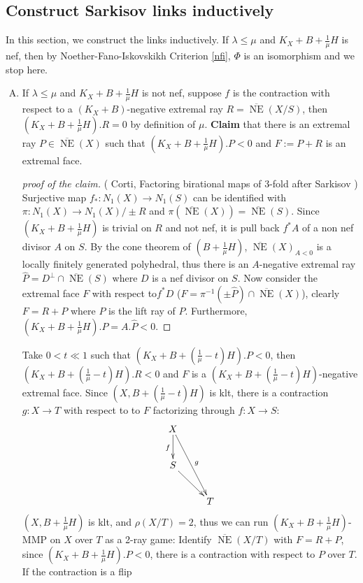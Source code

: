 \documentclass{article}
\begin{document}
\subsection{Construct Sarkisov links inductively}\label{constructlink1}
In this section, we construct the links inductively. If $ \lambda\leqslant\mu $ and $ K_X+B+\frac{1}{\mu}H $ is nef, then by Noether-Fano-Iskovskikh Criterion \ref{nfi}, $ \Phi $ is an isomorphism and we stop here.
\begin{enumerate}[(A)]
  \item\label{1A} If $ \lambda\leqslant\mu $ and $ K_X+B+\frac{1}{\mu}H $ is not nef, suppose $ f $ is the contraction with respect to a $ (K_X+B) $-negative extremal ray $ R= \overline{\operatorname{ NE }}(X/S) $, then $ (K_X+B+\frac{1}{\mu}H).R=0 $ by definition of $ \mu $. \textbf{Claim} that there is an extremal ray $ P\in \overline{\operatorname{ NE }}(X) $ such that $ (K_X+B+\frac{1}{\mu}H).P<0 $ and $ F:=P+R $ is an extremal face.
    \begin{proof}[proof of the claim]
    ( Corti, Factoring birational maps of 3-fold after Sarkisov ) Surjective map $ f_*:N_1(X)\to N_1(S) $ can be identified with $ \pi: N_1(X)\to N_1(X)/\pm R $ and $ \pi(\overline{\operatorname{NE}}(X))=\overline{\operatorname{NE}}(S) $. Since $ (K_X+B+\frac{1}{\mu}H) $ is trivial on $ R $ and not nef, it is pull back $ f^*A $ of a non nef divisor $ A $ on $ S $. By the cone theorem of $ (B+\frac{1}{\mu}H) $, $ \overline{\operatorname{NE}}(X)_{A<0} $ is a locally finitely generated polyhedral, thus there is an  $ A $-negative extremal ray $ \hat{P}=D^\perp\cap \overline{\operatorname{NE}}(S) $ where $ D $ is a nef divisor on $ S $. Now consider the extremal face $ F $ with respect to$ f^*D $ ($ F=\pi^{-1}(\pm \hat{P})\cap \overline{\operatorname{NE}}(X) $), clearly $ F=R+P $ where $ P $ is the lift ray of $ \hat P $. Furthermore, $ (K_X+B+\frac{1}{\mu}H).P=A.\hat P<0 $.
\end{proof}
  Take  $ 0<t\ll 1 $ such that $ (K_X+B+(\frac{1}{\mu}-t)H).P<0 $, then $  (K_X+B+(\frac{1}{\mu}-t)H).R<0 $ and $ F $ is a $  (K_X+B+(\frac{1}{\mu}-t)H) $-negative extremal face. Since $ (X,B+(\frac{1}{\mu}-t)H) $ is klt, there is  a contraction $ g:X\to T $ with respect to to $ F $ factorizing through $ f:X\to S $: 
  \[ \xymatrix{
    X\ar[d]_f\ar[ddr]^g&\\
    S\ar[dr]&\\
    &T }\]
  $ (X,B+\frac{1}{\mu}H) $ is klt, and $ \rho(X/T)=2 $, thus we can  run $ (K_X+B+\frac{1}{\mu}H) $-MMP on $ X $ over $ T $ as a 2-ray game: Identify $ \overline{\operatorname{NE}}(X/T) $ with $ F=R+P $, since $ (K_X+B+\frac{1}{\mu}H).P<0 $, there is a contraction with respect to $ P $ over $ T $. If the contraction is a flip

\end{enumerate}
\end{document}
